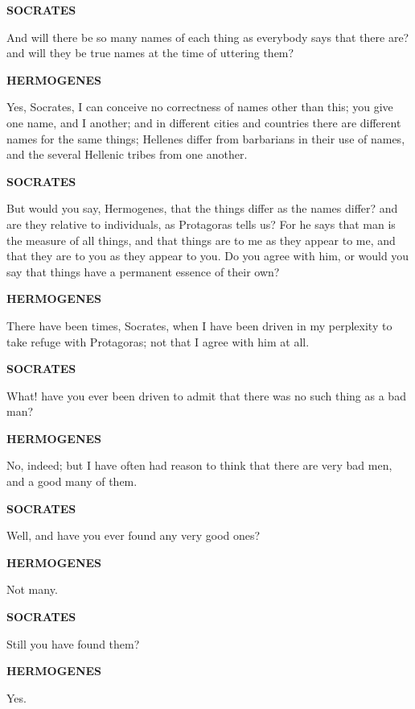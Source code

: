 \documentclass[11pt,letter]{article}
\begin{document}
\par \textbf{SOCRATES}
\par   And will there be so many names of each thing as everybody says that there are? and will they be true names at the time of uttering them?

\par \textbf{HERMOGENES}
\par   Yes, Socrates, I can conceive no correctness of names other than this; you give one name, and I another; and in different cities and countries there are different names for the same things; Hellenes differ from barbarians in their use of names, and the several Hellenic tribes from one another.

\par \textbf{SOCRATES}
\par   But would you say, Hermogenes, that the things differ as the names differ? and are they relative to individuals, as Protagoras tells us? For he says that man is the measure of all things, and that things are to me as they appear to me, and that they are to you as they appear to you. Do you agree with him, or would you say that things have a permanent essence of their own?

\par \textbf{HERMOGENES}
\par   There have been times, Socrates, when I have been driven in my perplexity to take refuge with Protagoras; not that I agree with him at all.

\par \textbf{SOCRATES}
\par   What! have you ever been driven to admit that there was no such thing as a bad man?

\par \textbf{HERMOGENES}
\par   No, indeed; but I have often had reason to think that there are very bad men, and a good many of them.

\par \textbf{SOCRATES}
\par   Well, and have you ever found any very good ones?

\par \textbf{HERMOGENES}
\par   Not many.

\par \textbf{SOCRATES}
\par   Still you have found them?

\par \textbf{HERMOGENES}
\par   Yes.
\end{document}
